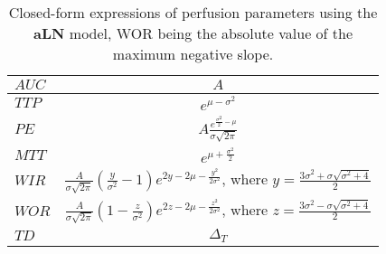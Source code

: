 \begin{table}[!h]
\begin{center}
\begin{tabular}{lc}
\toprule
\textbf{$AUC$} & $A$ \\
\midrule
\textbf{$TTP$} & $e^{\mu - \sigma^2}$  \\
\midrule
\textbf{$PE$} & $A\frac{e^{\frac{\sigma^2}{2}-\mu}}{\sigma \sqrt{2\pi}}$  \\
\midrule
\textbf{$MTT$} & $e^{\mu + \frac{\sigma^2}{2}}$ \\
\midrule
\textbf{$WIR$}
 & $\frac{A}{\sigma\sqrt{2\pi}}\left(\frac{y}{\sigma^2}-1\right)e^{2y-2\mu-\frac{y^2}{2\sigma^2}}$, where $y = \frac{3\sigma^2+\sigma\sqrt{\sigma^2+4}}{2}$ \\
\midrule
\textbf{$WOR$} & $\frac{A}{\sigma\sqrt{2\pi}}\left(1-\frac{z}{\sigma^2}\right)e^{2z-2\mu-\frac{z^2}{2\sigma^2}}$, where $z = \frac{3\sigma^2-\sigma\sqrt{\sigma^2+4}}{2}$ \\
\midrule
\textbf{$TD$} & $\Delta_T$ \\
\bottomrule
\end{tabular}
\caption{Closed-form expressions of perfusion parameters using the \textbf{aLN} model, WOR being the absolute value of the maximum negative slope.}
\label{tab:AnalyticRelation}
\end{center}
\end{table}

